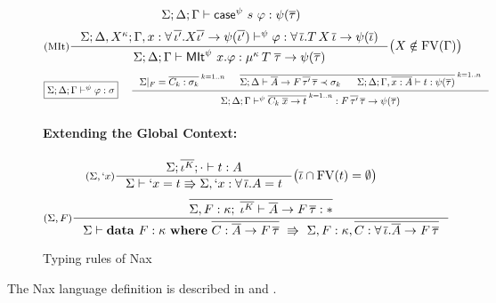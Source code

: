 \begin{figure}
\begin{framed}
\[      {\Sigma;\Delta;\Gamma |- \mathsf{case}^\psi~s~\varphi
                             : \psi(\overline\tau) }
\]
\[ \inference[(MIt)]
      { \Sigma;\Delta,X^\kappa;
               \Gamma,x:\forall\,\overline{\iota'} . X\overline{\iota'}
                                              -> \psi(\overline{\iota'})
           |-^\psi \varphi
           : \forall\,\overline\iota . T\,X\,\overline\iota
                                     -> \psi(\overline\iota) }
      {\Sigma;\Delta;\Gamma
           |- \MIt^\psi ~ x.\varphi
            : \mu^{\kappa}\,T\;\overline\tau -> \psi(\overline\tau) }
      \big( X\notin\FV(\Gamma) \big)
\]
\[ \fbox{$\Sigma;\Delta;\Gamma |-^\psi \varphi : \sigma$}
 ~~~~
   \inference
      { \Sigma|_F = \overline{C_k:\sigma_k}^{\;k=1..n} &
        \overline{
        \begin{matrix}
         \Sigma;\Delta
           |- \overline{A} -> F\,\overline{\tau'}\,\overline\tau\prec\sigma_k
        ~&~
         \Sigma;\Delta;\Gamma,\overline{x:A} |- t : \psi(\overline\tau) 
        \end{matrix} }^{\;k=1..n} }
      { \Sigma;\Delta;\Gamma
           |-^\psi \overline{C_k\;\overline{x} -> t}^{\;k=1..n}
           : F\,\overline{\tau'}\,\overline\tau -> \psi(\overline\tau) }
\]

\paragraph{Extending the Global Context:}
\[ \inference[($\Sigma,`x$)]
       {\Sigma;\overline{\iota^K};\cdot |- t : A}
       {\Sigma |- `x = t \Rrightarrow \Sigma,`x:\forall\,\overline{\iota}.A=t}
      \big( \overline{\iota} \cap \FV(t) = \emptyset \big)
\]
\[ \inference[($\Sigma,F$)]
      { \overline{ \Sigma,F:\kappa;\;\overline{\iota^K}
                      |- \overline{A} -> F\,\overline\tau :*} }
      { \Sigma |- \mathbf{data}~ F : \kappa ~ \mathbf{where} ~
                  \overline{C : \overline{A} -> F\,\overline\tau }
               ~\Rrightarrow~
                  \Sigma,F:\kappa
                        ,\overline{C:\forall\,\overline{\iota}.\overline{A}
                                                       -> F\,\overline\tau} }
\]
\end{framed}
\caption{Typing rules of Nax}
\label{fig:NaxTyping}
\end{figure}

The Nax language definition is described in  and .

